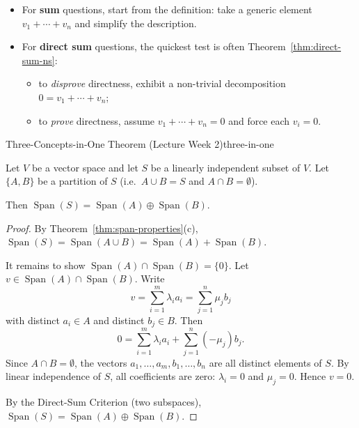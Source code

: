 \begin{examtip}

\begin{itemize}[leftmargin=*]

\item For \textbf{sum} questions, start from the definition: take a generic element $v_1+\cdots+v_n$ and simplify the description.

\item For \textbf{direct sum} questions, the quickest test is often Theorem~\ref{thm:direct-sum-ns}:

\begin{itemize}[leftmargin=*]

\item to \emph{disprove} directness, exhibit a non-trivial decomposition $0=v_1+\cdots+v_n$;

\item to \emph{prove} directness, assume $v_1+\cdots+v_n=0$ and force each $v_i=0$.

\end{itemize}

\end{itemize}

\end{examtip}

\begin{theorem}{Three-Concepts-in-One Theorem (Lecture Week 2)}{three-in-one}

Let $V$ be a vector space and let $S$ be a linearly independent subset of $V$.
Let $\{A,B\}$ be a partition of $S$ (i.e.\ $A\cup B=S$ and $A\cap B=\emptyset$).

Then $\operatorname{Span}(S)=\operatorname{Span}(A)\oplus\operatorname{Span}(B)$.
\end{theorem}

\begin{proof}
By Theorem~\ref{thm:span-properties}(c), $\operatorname{Span}(S)=\operatorname{Span}(A\cup B)=\operatorname{Span}(A)+\operatorname{Span}(B)$.

It remains to show $\operatorname{Span}(A)\cap\operatorname{Span}(B)=\{0\}$.
Let $v\in\operatorname{Span}(A)\cap\operatorname{Span}(B)$.  Write
\[
v=\sum_{i=1}^m \lambda_i a_i = \sum_{j=1}^n \mu_j b_j
\]
with distinct $a_i\in A$ and distinct $b_j\in B$.  Then
\[
0=\sum_{i=1}^m \lambda_i a_i + \sum_{j=1}^n (-\mu_j) b_j.
\]
Since $A\cap B=\emptyset$, the vectors $a_1,\dots,a_m,b_1,\dots,b_n$ are all distinct elements of $S$.  By linear independence of $S$, all coefficients are zero: $\lambda_i=0$ and $\mu_j=0$.  Hence $v=0$.

By the Direct-Sum Criterion (two subspaces), $\operatorname{Span}(S)=\operatorname{Span}(A)\oplus\operatorname{Span}(B)$.
\end{proof}

